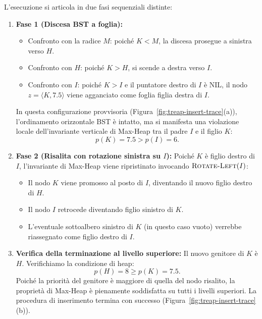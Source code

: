 L'esecuzione si articola in due fasi sequenziali distinte:
\begin{enumerate}
    \item \textbf{Fase 1 (Discesa BST a foglia):}
    \begin{itemize}
        \item Confronto con la radice $M$: poich\'e $K < M$, la discesa prosegue a sinistra verso $H$.
        \item Confronto con $H$: poich\'e $K > H$, si scende a destra verso $I$.
        \item Confronto con $I$: poich\'e $K > I$ e il puntatore destro di $I$ \`e $\mathrm{NIL}$, il nodo $z = \langle K, 7.5 \rangle$ viene agganciato come foglia figlia destra di $I$.
    \end{itemize}
    In questa configurazione provvisoria (Figura~\ref{fig:treap-insert-trace}(a)), l'ordinamento orizzontale BST \`e intatto, ma si manifesta una violazione locale dell'invariante verticale di Max-Heap tra il padre $I$ e il figlio $K$:
    \begin{equation}
      p(K) = 7.5 > p(I) = 6.
    \end{equation}
    
    \item \textbf{Fase 2 (Risalita con rotazione sinistra su $I$):}
    Poich\'e $K$ \`e figlio destro di $I$, l'invariante di Max-Heap viene ripristinato invocando $\textsc{Rotate-Left}(I)$:
    \begin{itemize}
        \item Il nodo $K$ viene promosso al posto di $I$, diventando il nuovo figlio destro di $H$.
        \item Il nodo $I$ retrocede diventando figlio sinistro di $K$.
        \item L'eventuale sottoalbero sinistro di $K$ (in questo caso vuoto) verrebbe riassegnato come figlio destro di $I$.
    \end{itemize}
    \item \textbf{Verifica della terminazione al livello superiore:}
    Il nuovo genitore di $K$ \`e $H$. Verifichiamo la condizione di heap:
    \begin{equation}
      p(H) = 8 \ge p(K) = 7.5.
    \end{equation}
    Poich\'e la priorit\`a del genitore \`e maggiore di quella del nodo risalito, la propriet\`a di Max-Heap \`e pienamente soddisfatta su tutti i livelli superiori. La procedura di inserimento termina con successo (Figura~\ref{fig:treap-insert-trace}(b)).
\end{enumerate}

